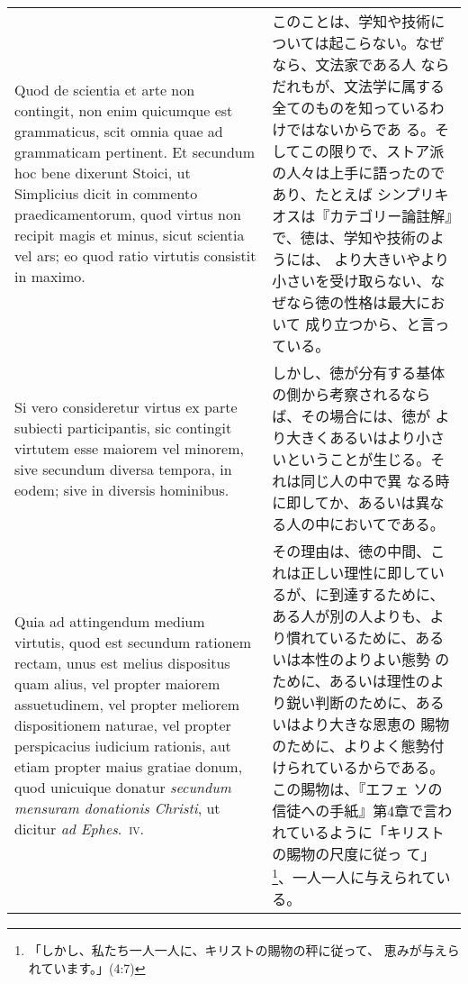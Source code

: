 \documentclass[10pt]{jsarticle}
\begin{document}
\begin{longtable}{p{21em}p{21em}}
\\

 Quod de scientia et arte non contingit, non enim quicumque
 est grammaticus, scit omnia quae ad grammaticam pertinent. Et
 secundum hoc bene dixerunt Stoici, ut Simplicius dicit in commento
 praedicamentorum, quod virtus non recipit magis et minus, sicut
 scientia vel ars; eo quod ratio virtutis consistit in maximo.
 
&

 このことは、学知や技術については起こらない。なぜなら、文法家である人
 ならだれもが、文法学に属する全てのものを知っているわけではないからであ
 る。そしてこの限りで、ストア派の人々は上手に語ったのであり、たとえば
 シンプリキオスは『カテゴリー論註解』で、徳は、学知や技術のようには、
 より大きいやより小さいを受け取らない、なぜなら徳の性格は最大において
 成り立つから、と言っている。

\\

 Si vero
 consideretur virtus ex parte subiecti participantis, sic contingit
 virtutem esse maiorem vel minorem, sive secundum diversa tempora, in
 eodem; sive in diversis hominibus.
 
&

 しかし、徳が分有する基体の側から考察されるならば、その場合には、徳が
 より大きくあるいはより小さいということが生じる。それは同じ人の中で異
 なる時に即してか、あるいは異なる人の中においてである。

\\

 Quia ad attingendum medium virtutis, quod est secundum rationem
 rectam, unus est melius dispositus quam alius, vel propter maiorem
 assuetudinem, vel propter meliorem dispositionem naturae, vel propter
 perspicacius iudicium rationis, aut etiam propter maius gratiae
 donum, quod unicuique donatur {\itshape secundum mensuram donationis
 Christi}, ut dicitur {\itshape ad Ephes}.~{\scshape iv}.
 
&

その理由は、徳の中間、これは正しい理性に即しているが、に到達するために、
ある人が別の人よりも、より慣れているために、あるいは本性のよりよい態勢
のために、あるいは理性のより鋭い判断のために、あるいはより大きな恩恵の
賜物のために、よりよく態勢付けられているからである。この賜物は、『エフェ
ソの信徒への手紙』第4章で言われているように「キリストの賜物の尺度に従っ
て」\footnote{「しかし、私たち一人一人に、キリストの賜物の秤に従って、
恵みが与えられています。」(4:7)}、一人一人に与えられている。



\end{longtable}
\end{document}
